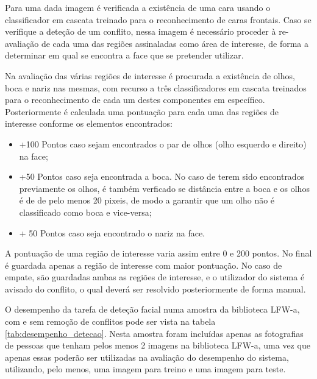 Para uma dada imagem é verificada a existência de uma cara usando o classificador em cascata treinado para o reconhecimento de caras frontais. Caso se verifique a deteção de um conflito, nessa imagem é necessário proceder à re-avaliação de cada uma das regiões assinaladas como área de interesse, de forma a determinar em qual se encontra a face que se pretender utilizar.

Na avaliação das várias regiões de interesse é procurada a existência de olhos, boca e nariz nas mesmas, com recurso a três classificadores em cascata treinados para o reconhecimento de cada um destes componentes em específico. Posteriormente é calculada uma pontuação para cada uma das regiões de interesse conforme os elementos encontrados:
\begin{itemize}
\item +100 Pontos caso sejam encontrados o par de olhos (olho esquerdo e direito) na face;
\item +50 Pontos caso seja encontrada a boca. No caso de terem sido encontrados previamente os olhos, é também verficado se distância entre a boca e os olhos é de de pelo menos 20 pixeis, de modo a garantir que um olho não é classificado como boca e vice-versa;
\item + 50 Pontos caso seja encontrado o nariz na face.
\end{itemize}
A pontuação de uma região de interesse varia assim entre 0 e 200 pontos. No final é guardada apenas a região de interesse com maior pontuação. No caso de empate, são guardadas ambas as regiões de interesse, e o utilizador do sistema é avisado do conflito, o qual deverá ser resolvido posteriormente de forma manual.

O desempenho da tarefa de deteção facial numa amostra da biblioteca LFW-a, com e sem remoção de conflitos pode ser vista na tabela \ref{tab:desempenho_detecao}. Nesta amostra foram incluídas apenas as fotografias de pessoas que tenham pelos menos 2 imagens na biblioteca LFW-a, uma vez que apenas essas poderão ser utilizadas na avaliação do desempenho do sistema, utilizando, pelo menos, uma imagem para treino e uma imagem para teste.

